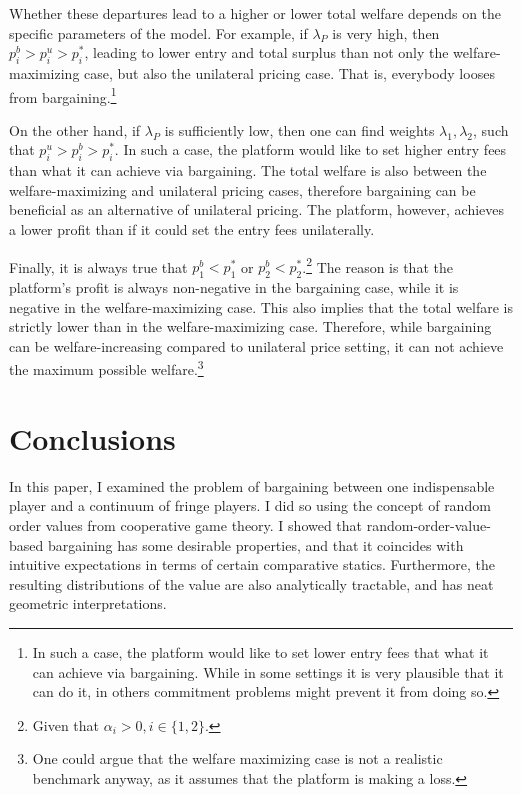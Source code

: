 \documentclass[a4paper]{article}
\begin{document}
Whether these departures lead to a higher or lower total welfare depends on the specific parameters of the model.
For example, if $\lambda_P$ is very high, then $p_i^b > p_i^u > p_i^*$, leading to lower entry and total surplus than not only the welfare-maximizing case, but also the unilateral pricing case.
That is, everybody looses from bargaining.\footnote{
    In such a case, the platform would like to set lower entry fees that what it can achieve via bargaining.
    While in some settings it is very plausible that it can do it, in others commitment problems might prevent it from doing so.
}

On the other hand, if $\lambda_P$ is sufficiently low, then one can find weights $\lambda_1, \lambda_2$, such that $p_i^u > p_i^b > p_i^*$.
In such a case, the platform would like to set higher entry fees than what it can achieve via bargaining.
The total welfare is also between the welfare-maximizing and unilateral pricing cases, therefore bargaining can be beneficial as an alternative of unilateral pricing.
The platform, however, achieves a lower profit than if it could set the entry fees unilaterally.

Finally, it is always true that $p_1^b < p_1^*$ or $p_2^b < p_2^*$.\footnote{
    Given that $\alpha_i > 0, i \in \{1, 2\}$.
}
The reason is that the platform's profit is always non-negative in the bargaining case, while it is negative in the welfare-maximizing case.
This also implies that the total welfare is strictly lower than in the welfare-maximizing case.
Therefore, while bargaining can be welfare-increasing compared to unilateral price setting, it can not achieve the maximum possible welfare.\footnote{
    One could argue that the welfare maximizing case is not a realistic benchmark anyway, as it assumes that the platform is making a loss.
}

\section{Conclusions}

In this paper, I examined the problem of bargaining between one indispensable player and a continuum of fringe players.
I did so using the concept of random order values from cooperative game theory.
I showed that random-order-value-based bargaining has some desirable properties, and that it coincides with intuitive expectations in terms of certain comparative statics.
Furthermore, the resulting distributions of the value are also analytically tractable, and has neat geometric interpretations.
\end{document}
